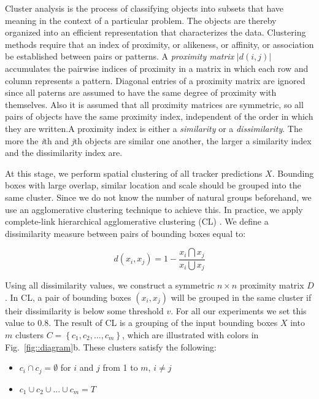 Cluster analysis is the process of classifying objects into subsets that have
meaning in the context of a particular problem. The objects are thereby
organized into an efficient representation that characterizes the data.
Clustering methods require that an index of proximity, or alikeness, or
affinity, or association be established between pairs or patterns. A
\textit{proximity matrix} $|d(i, j)|$ accumulates the pairwise indices of
proximity in a matrix in which each row and column represents a pattern.
Diagonal entries of a proximity matrix are ignored since all paterns are
assumed to have the same degree of proximity with themselves. Also it is
assumed that all proximity matrices are symmetric, so all pairs of objects have
the same proximity index, independent of the order in which they are written.A
proximity index is either a \textit{similarity} or a \textit{dissimilarity}.
The more the \textit{i}th and \textit{j}th objects are similar one another, the
larger a similarity index and the dissimilarity index are.

At this stage, we perform spatial clustering of all tracker predictions $X$.
Bounding boxes with large overlap, similar location and scale should be grouped
into the same cluster.
Since we do not know the number of natural groups beforehand, we use
an agglomerative clustering technique to achieve this. In practice,
we apply complete-link hierarchical agglomerative clustering (CL)
\cite{Jain88}.
We define a dissimilarity measure between pairs of bounding boxes equal to:

\begin{equation}
d(x_i,x_j) = 1 - \frac{x_i \bigcap x_j}{x_i \bigcup  x_j}
\end{equation}

Using all dissimilarity values, we construct a symmetric $n \times n$ proximity
matrix $D$. In CL, a pair of bounding boxes $(x_i, x_j)$ will be grouped in
the same cluster if their dissimilarity is below some threshold $v$.
For all our experiments we set this value to $0.8$.
The result of CL is a grouping of the input bounding boxes $X$ into 
$m$ clusters $C = \left \{ c_1, c_2, ..., c_m \right \}$,
which are illustrated with colors in Fig.~\ref{fig::diagram}b. These clusters
satisfy the following:
\begin{itemize}
\item $c_i \cap c_j = \emptyset$ for $i$ and $j$ from 1 to $m$, $i \neq j$
\item $c_1 \cup c_2 \cup ... \cup c_m = T$
\end{itemize}

